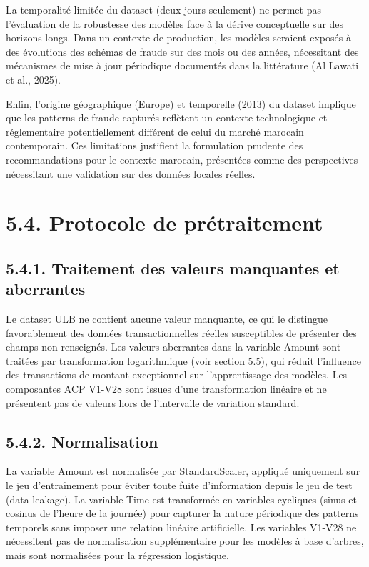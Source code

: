 La temporalité limitée du dataset (deux jours seulement) ne permet pas l'évaluation de la robustesse des modèles face à la dérive conceptuelle sur des horizons longs. Dans un contexte de production, les modèles seraient exposés à des évolutions des schémas de fraude sur des mois ou des années, nécessitant des mécanismes de mise à jour périodique documentés dans la littérature (Al Lawati et al., 2025).

Enfin, l'origine géographique (Europe) et temporelle (2013) du dataset implique que les patterns de fraude capturés reflètent un contexte technologique et réglementaire potentiellement différent de celui du marché marocain contemporain. Ces limitations justifient la formulation prudente des recommandations pour le contexte marocain, présentées comme des perspectives nécessitant une validation sur des données locales réelles.

\section{5.4. Protocole de prétraitement}

\subsection{5.4.1. Traitement des valeurs manquantes et aberrantes}

Le dataset ULB ne contient aucune valeur manquante, ce qui le distingue favorablement des données transactionnelles réelles susceptibles de présenter des champs non renseignés. Les valeurs aberrantes dans la variable Amount sont traitées par transformation logarithmique (voir section 5.5), qui réduit l'influence des transactions de montant exceptionnel sur l'apprentissage des modèles. Les composantes ACP V1-V28 sont issues d'une transformation linéaire et ne présentent pas de valeurs hors de l'intervalle de variation standard.

\subsection{5.4.2. Normalisation}

La variable Amount est normalisée par StandardScaler, appliqué uniquement sur le jeu d'entraînement pour éviter toute fuite d'information depuis le jeu de test (data leakage). La variable Time est transformée en variables cycliques (sinus et cosinus de l'heure de la journée) pour capturer la nature périodique des patterns temporels sans imposer une relation linéaire artificielle. Les variables V1-V28 ne nécessitent pas de normalisation supplémentaire pour les modèles à base d'arbres, mais sont normalisées pour la régression logistique.

